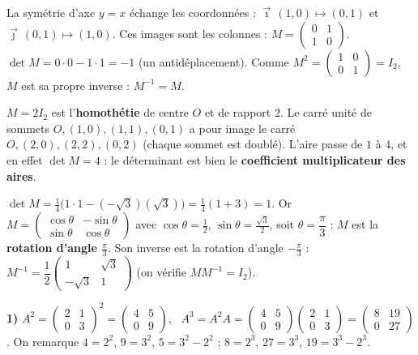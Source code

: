 La symétrie d'axe $y=x$ échange les coordonnées : $\vec\imath\,(1,0)\mapsto(0,1)$ et
$\vec\jmath\,(0,1)\mapsto(1,0)$. Ces images sont les colonnes :
$M=\begin{pmatrix}0&1\\1&0\end{pmatrix}$. $\det M=0\cdot0-1\cdot1=-1$ (un antidéplacement).
Comme $M^2=\begin{pmatrix}1&0\\0&1\end{pmatrix}=I_2$, $M$ est sa propre inverse : $M^{-1}=M$.

$M=2I_2$ est l'\textbf{homothétie} de centre $O$ et de rapport $2$. Le carré unité de sommets
$O,(1,0),(1,1),(0,1)$ a pour image le carré $O,(2,0),(2,2),(0,2)$ (chaque sommet est doublé).
L'aire passe de $1$ à $4$, et en effet $\det M=4$ : le déterminant est bien le \textbf{coefficient
multiplicateur des aires}.

$\det M=\tfrac14\big(1\cdot1-(-\sqrt3)(\sqrt3)\big)=\tfrac14(1+3)=1$.
Or $M=\begin{pmatrix}\cos\theta&-\sin\theta\\\sin\theta&\cos\theta\end{pmatrix}$ avec
$\cos\theta=\tfrac12$, $\sin\theta=\tfrac{\sqrt3}2$, soit $\theta=\dfrac\pi3$ : $M$ est la
\textbf{rotation d'angle $\tfrac\pi3$}. Son inverse est la rotation d'angle $-\tfrac\pi3$ :
$M^{-1}=\dfrac12\begin{pmatrix}1&\sqrt3\\-\sqrt3&1\end{pmatrix}$ (on vérifie $MM^{-1}=I_2$).

\textbf{1)} $A^2=\begin{pmatrix}2&1\\0&3\end{pmatrix}^2=\begin{pmatrix}4&5\\0&9\end{pmatrix}$, \
$A^3=A^2A=\begin{pmatrix}4&5\\0&9\end{pmatrix}\begin{pmatrix}2&1\\0&3\end{pmatrix}=\begin{pmatrix}8&19\\0&27\end{pmatrix}$.
On remarque $4=2^2$, $9=3^2$, $5=3^2-2^2$ ; $8=2^3$, $27=3^3$, $19=3^3-2^3$.

